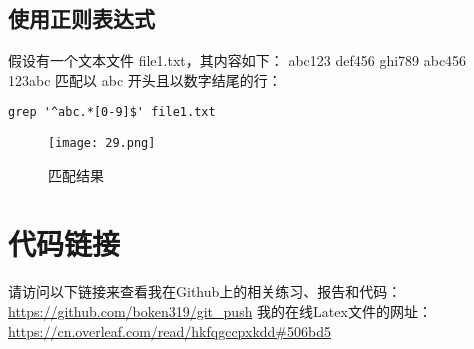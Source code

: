 \documentclass[a4paper, 12pt]{article}
\begin{document}
   \subsection{使用正则表达式}
假设有一个文本文件 file1.txt，其内容如下：
abc123
def456
ghi789
abc456
123abc
匹配以 abc 开头且以数字结尾的行：
\begin{verbatim}
grep '^abc.*[0-9]$' file1.txt
\end{verbatim}
  
\begin{figure}[H]
  \centering
    \texttt{[image: 29.png]}
  \caption{匹配结果}
   \end{figure}
  
 \section{代码链接}
      请访问以下链接来查看我在Github上的相关练习、报告和代码：
\url{https://github.com/boken319/git_push}
我的在线Latex文件的网址：
\url{https://cn.overleaf.com/read/hkfqgccpxkdd#506bd5}
\end{document}
